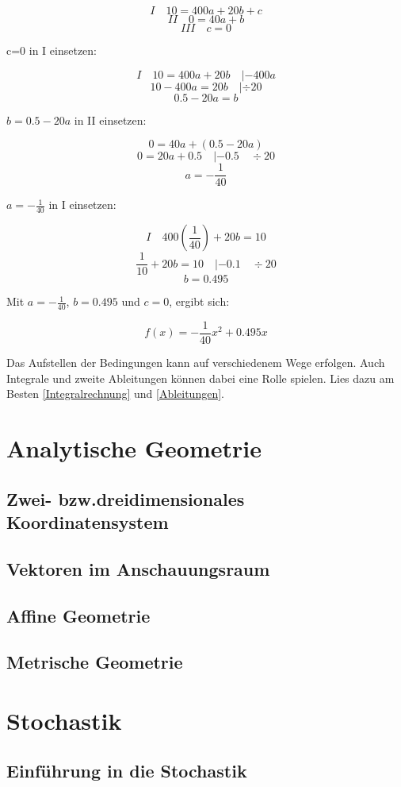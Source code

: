 \documentclass{article}
\begin{document}
			\[ I \quad 10=400a+20b+c \]
			\[ II \quad 0=40a+b \]
			\[ III \quad c=0 \]
			
			c=0 in I einsetzen:
			
			\[I \quad 10=400a+20b \quad |-400a \]
			\[ 10-400a=20b \quad | \div 20\]
			\[ 0.5-20a=b\]
			
			$b= 0.5-20a $ in II einsetzen:
			
			\[ 0=40a+(0.5-20a)\]
			\[ 0=20a+0.5 \quad |-0.5 \quad \div 20\]
			\[ a=-\frac{1}{40} \]
			
			$a=-\frac{1}{40}$ in I einsetzen:
			
			\[ I \quad 400(\frac{1}{40})+20b=10 \]
			\[ \frac{1}{10}+20b=10 \quad |-0.1 \quad \div 20\]
			\[ b=0.495\]
			
			Mit $a=-\frac{1}{40}$, $b=0.495$ und $c=0$, ergibt sich:
			
			\[f(x)=-\frac{1}{40}x^2+0.495x\]
			
			Das Aufstellen der Bedingungen kann auf verschiedenem Wege erfolgen. Auch Integrale und zweite Ableitungen können dabei eine Rolle spielen.
			Lies dazu am Besten \ref{Integralrechnung} und \ref{Ableitungen}.
		
\section{Analytische Geometrie}
\subsection{Zwei- bzw.dreidimensionales Koordinatensystem}
\subsection{Vektoren im Anschauungsraum}
\subsection{Affine Geometrie}
\subsection{Metrische Geometrie}

\section{Stochastik}
\subsection{Einführung in die Stochastik}
\end{document}
